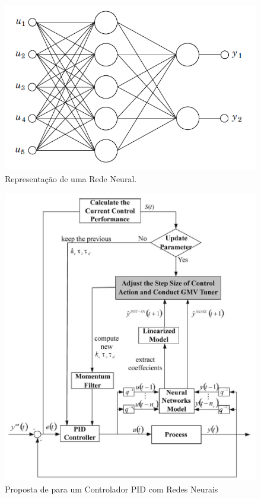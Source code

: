 \begin{figure}[!ht]
  \caption{Representação de uma Rede Neural.}
  \begin{center}
      \includegraphics[scale=0.65]{img/feedforward_neural_astrom_p297}
  \end{center}
  \label{fig:feedforward_neural_astrom_p297}
\end{figure}

\begin{figure}[!ht]
  \caption{Proposta de  para um Controlador PID com Redes Neurais}
  \begin{center}
      \includegraphics[scale=1]{img/pid_neural_Applying_p18}
  \end{center}
  \label{fig:pid_neural_Applying_p18}
\end{figure}

